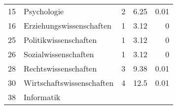 \begin{longtable}{lXrrr}
     15 &
     \multicolumn{1}{X}{ Psychologie   } &


       \num{2} &
       \num[round-mode=places,round-precision=2]{6,25} &
         \num[round-mode=places,round-precision=2]{0,01} \\

     16 &
     \multicolumn{1}{X}{ Erziehungswissenschaften   } &


       \num{1} &
       \num[round-mode=places,round-precision=2]{3,12} &
         \num[round-mode=places,round-precision=2]{0} \\

     25 &
     \multicolumn{1}{X}{ Politikwissenschaften   } &


       \num{1} &
       \num[round-mode=places,round-precision=2]{3,12} &
         \num[round-mode=places,round-precision=2]{0} \\

     26 &
     \multicolumn{1}{X}{ Sozialwissenschaften   } &


       \num{1} &
       \num[round-mode=places,round-precision=2]{3,12} &
         \num[round-mode=places,round-precision=2]{0} \\

     28 &
     \multicolumn{1}{X}{ Rechtswissenschaften   } &


       \num{3} &
       \num[round-mode=places,round-precision=2]{9,38} &
         \num[round-mode=places,round-precision=2]{0,01} \\

     30 &
     \multicolumn{1}{X}{ Wirtschaftswissenschaften   } &


       \num{4} &
       \num[round-mode=places,round-precision=2]{12,5} &
         \num[round-mode=places,round-precision=2]{0,01} \\

     38 &
     \multicolumn{1}{X}{ Informatik   } &



\end{longtable}
